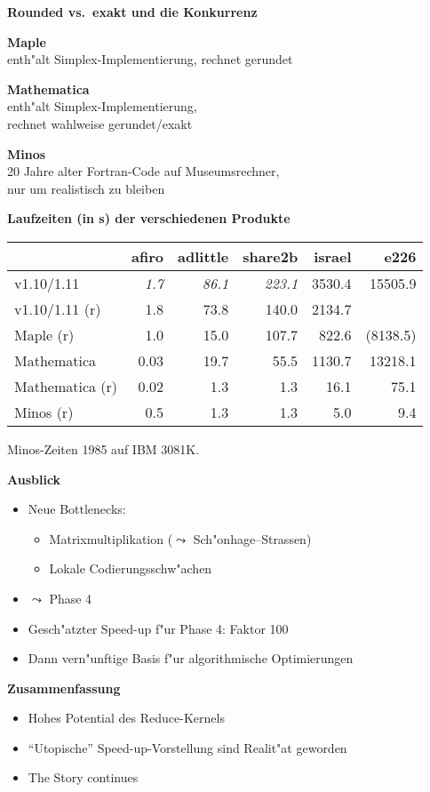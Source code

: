 \documentclass[slidesonly]{seminar}
\newcommand{\scaption}[1]{\centerline{\textbf{\large #1}}\medskip}
\newcommand{\subheader}[1]{\par\textbf{#1}{}}
\begin{document}
%
\begin{slide}
\scaption{Rounded vs.~exakt und die Konkurrenz}
\subheader{Maple}\\
enth"alt Simplex-Implementierung, rechnet gerundet
\subheader{Mathematica}\\
enth"alt Simplex-Implementierung,\\ rechnet wahlweise gerundet/exakt
\subheader{Minos}\\
20 Jahre alter Fortran-Code auf Museumsrechner,\\ nur um realistisch zu
bleiben
\end{slide}
%
\begin{slide}
\scaption{Laufzeiten (in s) der verschiedenen Produkte}
\begin{small}
\begin{tabular}{lrrrrr}
\hline
 & afiro  & adlittle & share2b  & israel & e226\\
\hline
v1.10/1.11
 &\textit{1.7}&\textit{86.1}&\textit{223.1}&3530.4&15505.9\\
v1.10/1.11 (r) & 1.8 & 73.8 & 140.0&2134.7&\\
Maple (r) &1.0&15.0&107.7&822.6&(8138.5)\\
Mathematica &0.03&19.7&55.5&1130.7&13218.1\\
Mathematica (r) &0.02&1.3&1.3&16.1&75.1\\
\hline
Minos (r) &0.5&1.3&1.3&5.0&9.4\\
\hline
\end{tabular}
\end{small}
\bigskip

Minos-Zeiten 1985 auf IBM 3081K.
\end{slide}
%
\begin{slide}
\scaption{Ausblick}
\begin{itemize}
\item Neue Bottlenecks:
\begin{itemize}
\item Matrixmultiplikation ($\leadsto$ Sch"onhage--Strassen)
\item Lokale Codierungsschw"achen
\end{itemize}
\item $\leadsto$ Phase 4
\item Gesch"atzter Speed-up f"ur Phase 4: Faktor 100
\item Dann vern"unftige Basis f"ur algorithmische Optimierungen
\end{itemize}
\end{slide}
%
\begin{slide}
\scaption{Zusammenfassung}
\begin{itemize}
\item Hohes Potential des Reduce-Kernels
\item "`Utopische"' Speed-up-Vorstellung sind Realit"at geworden
\item The Story continues
\end{itemize}
\end{slide}
% 
%
\end{document}
